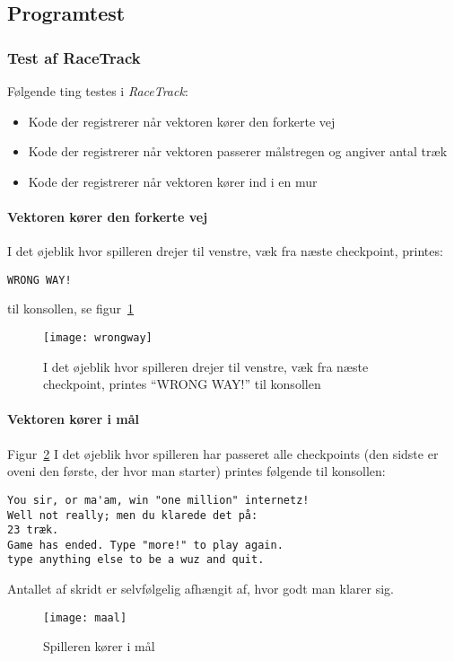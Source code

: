 \subsection{Programtest}

\subsubsection{Test af RaceTrack}
Følgende ting testes i \emph{RaceTrack}:
\begin{itemize}
  \item Kode der registrerer når vektoren kører den forkerte vej
  \item Kode der registrerer når vektoren passerer målstregen og angiver antal træk
  \item Kode der registrerer når vektoren kører ind i en mur
\end{itemize}

\paragraph{Vektoren kører den forkerte vej}
I det øjeblik hvor spilleren drejer til venstre, væk fra næste checkpoint, printes:
\begin{lstlisting}
WRONG WAY!
\end{lstlisting}
til konsollen, se figur~\ref{fig:wrongway}
\begin{figure}[h!]
	\centering
	\texttt{[image: wrongway]}
		\caption{I det øjeblik hvor spilleren drejer til venstre, væk fra næste checkpoint, printes ``WRONG WAY!'' til konsollen}\label{fig:wrongway}
\end{figure}

\paragraph{Vektoren kører i mål} Figur~\ref{fig:maal}
I det øjeblik hvor spilleren har passeret alle checkpoints (den sidste er oveni den første, der hvor man starter) printes følgende til konsollen:
\begin{lstlisting}
You sir, or ma'am, win "one million" internetz!
Well not really; men du klarede det på:
23 træk.
Game has ended. Type "more!" to play again.
type anything else to be a wuz and quit.
\end{lstlisting}
Antallet af skridt er selvfølgelig afhængit af, hvor godt man klarer sig.
\begin{figure}[h!]
	\centering
	\texttt{[image: maal]}
		\caption{Spilleren kører i mål}\label{fig:maal}
\end{figure}

